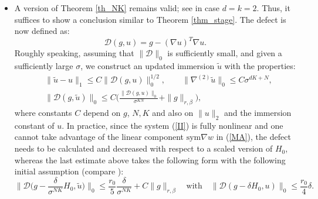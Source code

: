 \documentclass[reqno,twoside,11pt]{amsart}
\newcommand{\sym}{\mathrm{sym}}
\numberwithin{equation}{section}
\theoremstyle{plain}
\theoremstyle{definition}
\begin{document}
\begin{itemize}
\item[1.] A version of Theorem \ref{th_NK} remains valid; see
  \cite[Theorem 1.3]{lew_full2d2k} in case $d=k=2$. Thus, it 
suffices to show a conclusion similar to Theorem
\ref{thm_stage}. The defect is now defined as:
$$\mathcal{D}(g, u) = g - (\nabla u)^T\nabla u.$$
Roughly speaking, assuming that $\|\mathcal{D}\|_0$ is sufficiently
small, and given a sufficiently large $\sigma$, we construct an
updated immersion $\tilde u$ with the properties:
\begin{align}
    &\|\tilde u-u\|_1\leq C\|\mathcal{D}(g,u)\|_0^{1/2},\qquad
    \|\nabla^{(2)}\tilde u\|_0\leq C\sigma^{dK+N}, \nonumber\\
    &\|\mathcal{D}(g,\tilde u)\|_0\leq
    C\Big(\frac{\|\mathcal{D}(g,u)\|_0}{\sigma^{KN}} + \|g\|_{r,\beta} \Big),\nonumber
\end{align}
where constants $C$ depend on $g$, $N, K$ and also on $\|u\|_2$ and
the immersion constant of $u$. In practice, since
the system (\ref{II}) is fully nonlinear and one cannot take
advantage of the linear component $\sym \nabla w$ in (\ref{MA}),
the defect needs to be calculated and decreased with respect to a
scaled version of $H_0$, whereas the last estimate above takes the
following form with the following initial assumption (compare \cite[Theorem 1.2]{lew_full2d2k}):
$$\big\|\mathcal{D}\big(g-\frac{\delta}{\sigma^{NK}}H_0, \tilde u\big
)\big\|_0\leq \frac{r_0}{5}\frac{\delta}{\sigma^{NK}} + C
\|g\|_{r,\beta} \quad \mbox{with} \quad 
 \|\mathcal{D}(g-\delta H_0, u)\|_0\leq \frac{r_0}{4}\delta. $$

\smallskip


\end{itemize}
\end{document}
